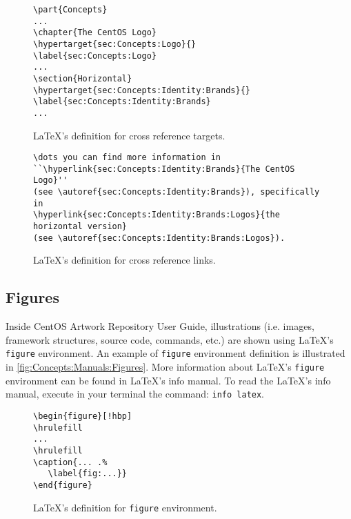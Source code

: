 \begin{figure}[!hbp]
\hrulefill
\begin{verbatim}
\part{Concepts}
...
\chapter{The CentOS Logo}
\hypertarget{sec:Concepts:Logo}{}
\label{sec:Concepts:Logo}
...
\section{Horizontal}
\hypertarget{sec:Concepts:Identity:Brands}{}
\label{sec:Concepts:Identity:Brands}
...
\end{verbatim}
\hrulefill
\caption{\LaTeX's definition for cross reference targets.%
   \label{fig:Concepts:Manuals:CrossRef:Targets}}
\end{figure}

\begin{figure}[!hbp]
\hrulefill
\begin{verbatim}
\dots you can find more information in
``\hyperlink{sec:Concepts:Identity:Brands}{The CentOS Logo}'' 
(see \autoref{sec:Concepts:Identity:Brands}), specifically in
\hyperlink{sec:Concepts:Identity:Brands:Logos}{the horizontal version} 
(see \autoref{sec:Concepts:Identity:Brands:Logos}).
\end{verbatim}
\hrulefill
\caption{\LaTeX's definition for cross reference links.%
   \label{fig:Concepts:Manuals:CrossRef:Links}}
\end{figure}

\subsection{Figures}

Inside CentOS Artwork Repository User Guide, illustrations (i.e.
images, framework structures, source code, commands, etc.) are shown
using \LaTeX's \texttt{figure} environment. An example of
\texttt{figure} environment definition is illustrated in
\autoref{fig:Concepts:Manuals:Figures}.  More information about
\LaTeX's \texttt{figure} environment can be found in \LaTeX's info
manual. To read the \LaTeX's info manual, execute in your terminal the
command: \texttt{info latex}.

\begin{figure}[!hbp]
\hrulefill
\begin{verbatim}
\begin{figure}[!hbp]
\hrulefill
...
\hrulefill
\caption{... .%
   \label{fig:...}}
\end{figure}
\end{verbatim}
\hrulefill
\caption{\LaTeX's definition for \texttt{figure} environment.%
   \label{fig:Concepts:Manuals:Figures}}
\end{figure}

